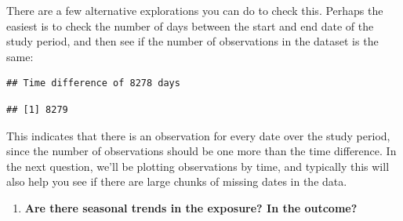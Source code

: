 \documentclass[
]{book}
\newenvironment{Shaded}{\begin{snugshade}}{\end{snugshade}}
\newcommand{\CommentTok}[1]{\textcolor[rgb]{0.56,0.35,0.01}{\textit{#1}}}
\newcommand{\KeywordTok}[1]{\textcolor[rgb]{0.13,0.29,0.53}{\textbf{#1}}}
\newcommand{\NormalTok}[1]{#1}
\newcommand{\OperatorTok}[1]{\textcolor[rgb]{0.81,0.36,0.00}{\textbf{#1}}}
\newcommand{\StringTok}[1]{\textcolor[rgb]{0.31,0.60,0.02}{#1}}
\providecommand{\tightlist}{%
  \setlength{\itemsep}{0pt}\setlength{\parskip}{0pt}}
\begin{document}
There are a few alternative explorations you can do to check this. Perhaps the
easiest is to check
the number of days between the start and end date of the study period, and
then see if the number of observations in the dataset is the same:

\begin{Shaded}
\end{Shaded}

\begin{verbatim}
## Time difference of 8278 days
\end{verbatim}

\begin{Shaded}
\end{Shaded}

\begin{verbatim}
## [1] 8279
\end{verbatim}

This indicates that there is an observation for every date over the study period,
since the number of observations should be one more than the time difference.
In the next question, we'll be plotting observations by time, and typically this
will also help you see if there are large chunks of missing dates in the data.

\begin{enumerate}
\def\labelenumi{\arabic{enumi}.}
\setcounter{enumi}{2}
\tightlist
\item
  \textbf{Are there seasonal trends in the exposure? In the outcome?}
\end{enumerate}
\end{document}
